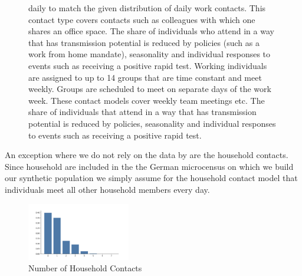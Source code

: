 \begin{figure}
{        daily to match the given distribution of daily work contacts. This contact type
        covers contacts such as colleagues with which one shares an office space. The
        share of individuals who attend in a way that has transmission potential is
        reduced by policies (such as a work from home mandate), seasonality and
        individual responses to events such as receiving a positive rapid test.
        Working individuals are assigned to up to 14 groups that are time constant and
        meet weekly. Groups are scheduled to meet on separate days of the work week.
        These contact models cover weekly team meetings etc. The share of individuals
        that attend in a way that has transmission potential is reduced by policies,
        seasonality and individual responses to events such as receiving a positive rapid
        test.}
\end{figure}


An exception where we do not rely on the data by \cite{Mossong2008} are the household
contacts. Since household are included in the the German microcensus
\citep{FDSAeDBUDL2018} on which we build our synthetic population we simply assume for
the household contact model that individuals meet all other household members every day.


\begin{figure}
    \centering
    \includegraphics[width=0.4\textwidth]{figures/results/figures/data/distributions_of_the_number_of_contacts/household}
    \caption{Number of Household Contacts}
    \label{n_contacts_hh}
\end{figure}

\FloatBarrier